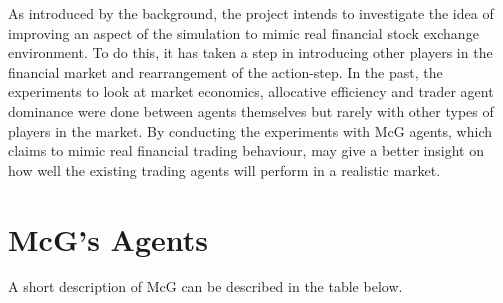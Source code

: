 % 

As introduced by the background, the project intends to investigate the idea of improving an aspect of the simulation to mimic real financial stock exchange environment. To do this, it has taken a step in introducing other players in the financial market and rearrangement of the action-step. In the past, the experiments to look at market economics, allocative efficiency and trader agent dominance were done between agents themselves but rarely with other types of players in the market. By conducting the experiments with McG agents, which claims to mimic real financial trading behaviour, may give a better insight on how well the existing trading agents will perform in a realistic market. 

\section{McG's Agents}
A short description of McG can be described in the table below.

